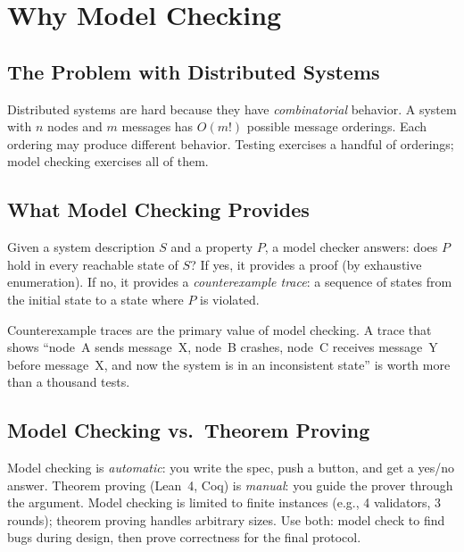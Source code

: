 \section{Why Model Checking}


\subsection{The Problem with Distributed Systems}

Distributed systems are hard because they have \emph{combinatorial} behavior. A system
with $n$ nodes and $m$ messages has $O(m!)$ possible message orderings. Each ordering
may produce different behavior. Testing exercises a handful of orderings; model checking
exercises all of them.

\subsection{What Model Checking Provides}

Given a system description $S$ and a property $P$, a model checker answers: does $P$
hold in every reachable state of $S$? If yes, it provides a proof (by exhaustive
enumeration). If no, it provides a \emph{counterexample trace}: a sequence of states
from the initial state to a state where $P$ is violated.

Counterexample traces are the primary value of model checking. A trace that shows
``node~A sends message~X, node~B crashes, node~C receives message~Y before message~X,
and now the system is in an inconsistent state'' is worth more than a thousand tests.

\subsection{Model Checking vs.\ Theorem Proving}

Model checking is \emph{automatic}: you write the spec, push a button, and get a yes/no
answer. Theorem proving (Lean~4, Coq) is \emph{manual}: you guide the prover through
the argument. Model checking is limited to finite instances (e.g., 4 validators, 3 rounds);
theorem proving handles arbitrary sizes. Use both: model check to find bugs during design,
then prove correctness for the final protocol.

